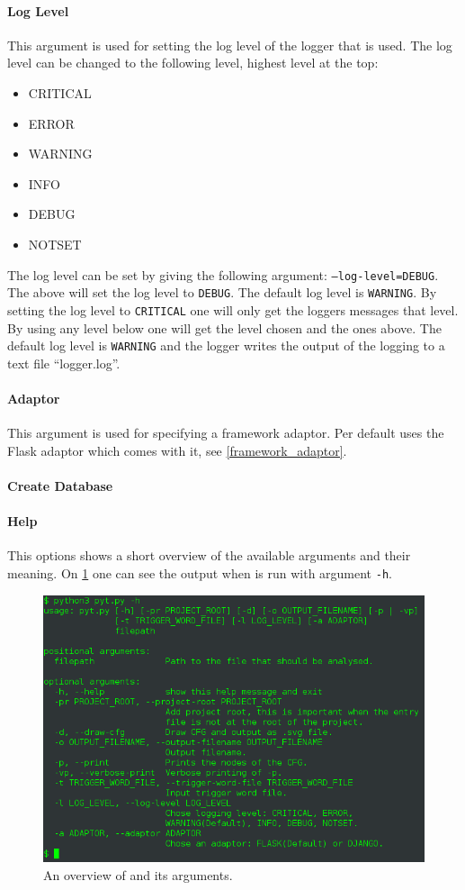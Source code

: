 \paragraph{Log Level}
This argument is used for setting the log level of the logger that is used.
The log level can be changed to the following level, highest level at the top:
\begin{itemize}
\item CRITICAL
\item ERROR
\item WARNING
\item INFO
\item DEBUG
\item NOTSET
\end{itemize}
The log level can be set by giving \pyt{} the following argument: \texttt{--log-level=DEBUG}.
The above will set the log level to \texttt{DEBUG}.
The default log level is \texttt{WARNING}.
By setting the log level to \texttt{CRITICAL} one will only get the loggers messages that level.
By using any level below one will get the level chosen and the ones above.
The default log level is \texttt{WARNING} and the logger writes the output of the logging to a text file ``logger.log''.

\paragraph{Adaptor}
This argument is used for specifying a framework adaptor.
Per default \pyt{} uses the Flask adaptor which comes with it, see \cref{framework_adaptor}.

\paragraph{Create Database}

\paragraph{Help}
This options shows a short overview of the available arguments and their meaning.
On \cref{tool_overview} one can see the output when \pyt{} is run with argument \texttt{-h}.

\begin{figure}
  \includegraphics[width=\textwidth]{./figures/pyt_overview.png}
  \caption{An overview of \pyt{} and its arguments.}
  \label{tool_overview}
\end{figure}
